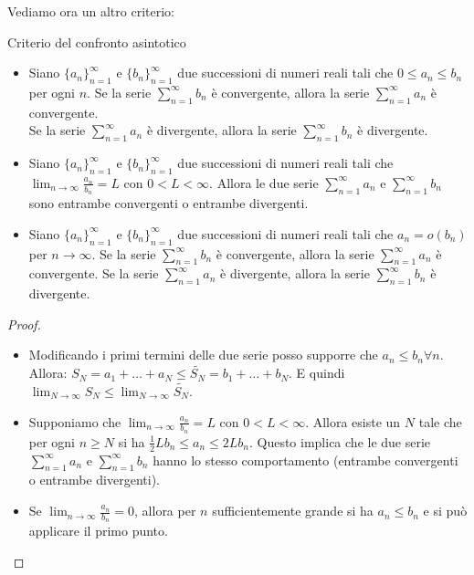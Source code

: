 Vediamo ora un altro criterio:
\begin{teorema}{Criterio del confronto asintotico}
  \begin{itemize}
  \item  Siano $\{a_n\}_{n=1}^{\infty}$ e $\{b_n\}_{n=1}^{\infty}$ due successioni di numeri reali tali che $0 \leq a_n \leq b_n$ per ogni $n$. Se la serie $\sum_{n=1}^{\infty} b_n$ è convergente, allora la serie $\sum_{n=1}^{\infty} a_n$ è convergente.\\
  Se la serie $\sum_{n=1}^{\infty} a_n$ è divergente, allora la serie $\sum_{n=1}^{\infty} b_n$ è divergente.
  \item Siano $\{a_n\}_{n=1}^{\infty}$ e $\{b_n\}_{n=1}^{\infty}$ due successioni di numeri reali tali che $\lim_{n \to \infty} \frac{a_n}{b_n} = L$ con $0 < L < \infty$. Allora le due serie $\sum_{n=1}^{\infty} a_n$ e $\sum_{n=1}^{\infty} b_n$ sono entrambe convergenti o entrambe divergenti.
  \item Siano $\{a_n\}_{n=1}^{\infty}$ e $\{b_n\}_{n=1}^{\infty}$ due successioni di numeri reali tali che $a_n = o(b_n)$ per $n \to \infty$. Se la serie $\sum_{n=1}^{\infty} b_n$ è convergente, allora la serie $\sum_{n=1}^{\infty} a_n$ è convergente. Se la serie $\sum_{n=1}^{\infty} a_n$ è divergente, allora la serie $\sum_{n=1}^{\infty} b_n$ è divergente.
  \end{itemize}
\end{teorema}

\begin{proof}
  \begin{itemize}
    \item Modificando i primi termini delle due serie posso supporre che $a_n\leq b_n \forall n$. Allora: $S_N = a_1+\dots+a_N\leq \tilde{S_N}=b_1+\dots+b_N$. E quindi $\lim_{N\to\infty} S_N \leq \lim_{N\to\infty} \tilde{S_N}$.\\
    \item Supponiamo che $\lim_{n \to \infty} \frac{a_n}{b_n} = L$ con $0 < L < \infty$. Allora esiste un $N$ tale che per ogni $n \geq N$ si ha $\frac{1}{2}L b_n \leq a_n \leq 2L b_n$. Questo implica che le due serie $\sum_{n=1}^{\infty} a_n$ e $\sum_{n=1}^{\infty} b_n$ hanno lo stesso comportamento (entrambe convergenti o entrambe divergenti).

    \item Se $\lim_{n \to \infty} \frac{a_n}{b_n} = 0$, allora per $n$ sufficientemente grande si ha $a_n\leq b_n$ e si può applicare il primo punto.
  \end{itemize}
  \end{proof}

